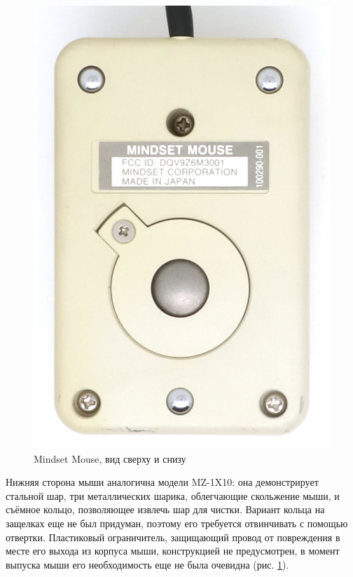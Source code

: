 \documentclass[11pt, a4paper]{article}
\begin{document}
\begin{figure}[h]
    \includegraphics[scale=0.55]{1984_mindset_mouse/bottom_30.jpg}
    \caption{Mindset Mouse, вид сверху и снизу}
    \label{fig:MindsetMouseTopAndBottom}
\end{figure}

Нижняя сторона мыши аналогична модели MZ-1X10: она демонстрирует стальной шар, три металлических шарика, облегчающие скольжение мыши, и съёмное кольцо, позволяющее извлечь шар для чистки. Вариант кольца на защелках еще не был придуман, поэтому его требуется отвинчивать с помощью отвертки. Пластиковый ограничитель, защищающий провод от повреждения в месте его выхода из корпуса мыши, конструкцией не предусмотрен, в момент выпуска мыши его необходимость еще не была очевидна (рис. \ref{fig:MindsetMouseTopAndBottom}).
\end{document}
